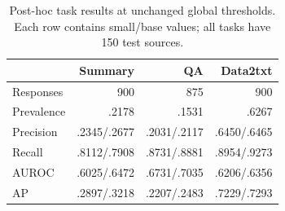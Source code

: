 \begin{table}[t]
\caption{Post-hoc task results at unchanged global thresholds. Each row contains small/base values; all tasks have 150 test sources.}
\label{tab:tasks}\centering\footnotesize
\begin{tabular}{lrrr}\toprule
 & Summary & QA & Data2txt\\\midrule
Responses & 900 & 875 & 900\\
Prevalence & .2178 & .1531 & .6267\\
Precision & .2345/.2677 & .2031/.2117 & .6450/.6465\\
Recall & .8112/.7908 & .8731/.8881 & .8954/.9273\\
AUROC & .6025/.6472 & .6731/.7035 & .6206/.6356\\
AP & .2897/.3218 & .2207/.2483 & .7229/.7293\\\bottomrule
\end{tabular}
\end{table}
